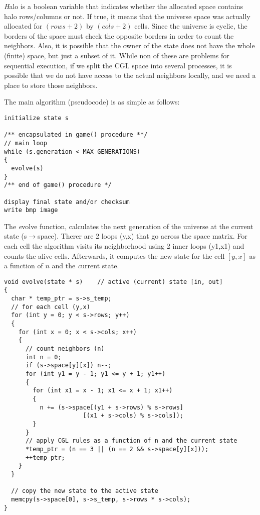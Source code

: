 \documentclass[a4paper,12pt,openany]{article}
\begin{document}
{\emph Halo} is a boolean variable that indicates whether the allocated space contains
halo rows/columns or not.
If true, it means that the universe space was actually allocated for $(rows+2)$ by $(cols+2)$ cells.
Since the universe is cyclic, the borders of the space must check the opposite borders in
order to count the neighbors.
Also, it is possible that the owner of the state does not have the whole (finite) space,
but just a subset of it.
While non of these are problems for sequential execution,
if we split the CGL space into several processes,
it is possible that we do not have access to the actual neighbors locally,
and we need a place to store those neighbors.

The main algorithm (pseudocode) is as simple as follows:

\begin{lstlisting}
initialize state s

/** encapsulated in game() procedure **/
// main loop
while (s.generation < MAX_GENERATIONS)
{
  evolve(s)
}
/** end of game() procedure */

display final state and/or checksum
write bmp image
\end{lstlisting}

The {\emph evolve} function, calculates the next generation of the universe at the current state (s$\rightarrow$space).
Therer are 2 loops (y,x) that go across the space matrix.
For each cell the algorithm visits its neighborhood using 2 inner loops (y1,x1) and
counts the alive cells.
Afterwards, it computes the new state for the cell $[y,x]$ as a function of $n$ and the {\emph current state}.

\begin{lstlisting}
void evolve(state * s)    // active (current) state [in, out]
{
  char * temp_ptr = s->s_temp;
  // for each cell (y,x)
  for (int y = 0; y < s->rows; y++)
  {
    for (int x = 0; x < s->cols; x++)
    {
      // count neighbors (n)
      int n = 0;
      if (s->space[y][x]) n--;
      for (int y1 = y - 1; y1 <= y + 1; y1++)
      {
        for (int x1 = x - 1; x1 <= x + 1; x1++)
        {
          n += (s->space[(y1 + s->rows) % s->rows]
                      [(x1 + s->cols) % s->cols]);
        }
      }
      // apply CGL rules as a function of n and the current state
      *temp_ptr = (n == 3 || (n == 2 && s->space[y][x]));
      ++temp_ptr;
    }
  }

  // copy the new state to the active state
  memcpy(s->space[0], s->s_temp, s->rows * s->cols);
}
\end{lstlisting}
\end{document}
